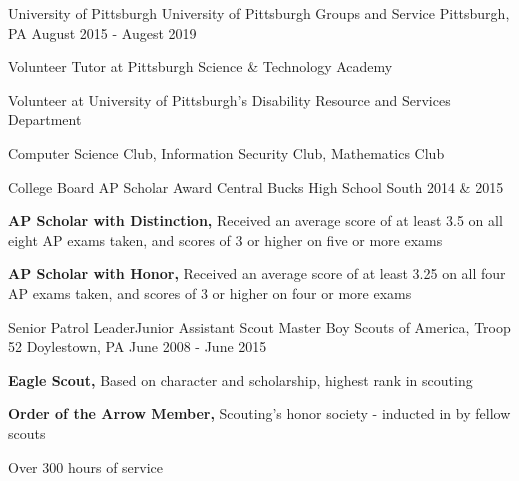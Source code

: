 
\vspace{-1mm}
\begin{cventries}

  \cventry
    {University of Pittsburgh} %
    {University of Pittsburgh Groups and Service} %
    {Pittsburgh, PA} %
    {August 2015 - Augest 2019} %
    {
      \begin{cvitems} %
        \item {Volunteer Tutor at Pittsburgh Science \& Technology Academy}
        \item {Volunteer at University of Pittsburgh’s Disability Resource and Services Department}
        \item {Computer Science Club, Information Security Club, Mathematics Club}
      \end{cvitems}
    }

  \cventry
    {College Board} %
    {AP Scholar Award} %
    {Central Bucks High School South} %
    {2014 \& 2015} %
    {
      \begin{cvitems} %
        \item {\textbf{AP Scholar with Distinction,} Received an average score of at least 3.5 on all eight AP exams taken, and scores of 3 or higher on five or more exams}
        \item {\textbf{AP Scholar with Honor,} Received an average score of at least 3.25 on all four AP exams taken, and scores of 3 or higher on four or more exams}
      \end{cvitems}
    }

  \cventry
    {Senior Patrol Leader{\enskip\cdotp\enskip}Junior Assistant Scout Master} %
    {Boy Scouts of America, Troop 52} %
    {Doylestown, PA} %
    {June 2008 - June 2015} %
    {
      \begin{cvitems} %
        \item {\textbf{Eagle Scout,} Based on character and scholarship, highest rank in scouting}
        \item {\textbf{Order of the Arrow Member,} Scouting’s honor society - inducted in by fellow scouts}
        \item {Over 300 hours of service}
      \end{cvitems}
    }


\end{cventries}
